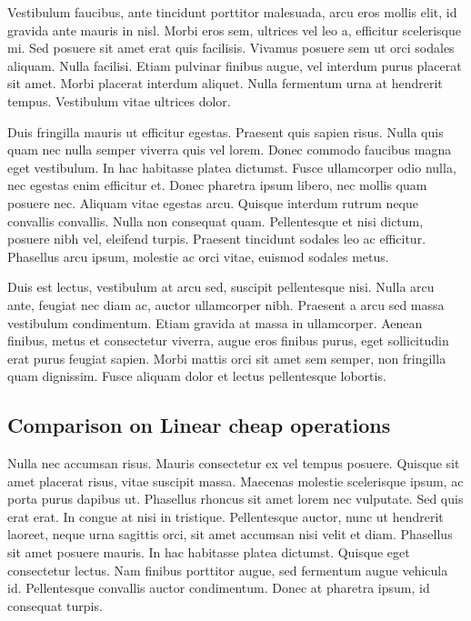 Vestibulum faucibus, ante tincidunt porttitor malesuada, arcu eros mollis elit, id gravida ante mauris in nisl. Morbi eros sem, ultrices vel leo a, efficitur scelerisque mi. Sed posuere sit amet erat quis facilisis. Vivamus posuere sem ut orci sodales aliquam. Nulla facilisi. Etiam pulvinar finibus augue, vel interdum purus placerat sit amet. Morbi placerat interdum aliquet. Nulla fermentum urna at hendrerit tempus. Vestibulum vitae ultrices dolor.

Duis fringilla mauris ut efficitur egestas. Praesent quis sapien risus. Nulla quis quam nec nulla semper viverra quis vel lorem. Donec commodo faucibus magna eget vestibulum. In hac habitasse platea dictumst. Fusce ullamcorper odio nulla, nec egestas enim efficitur et. Donec pharetra ipsum libero, nec mollis quam posuere nec. Aliquam vitae egestas arcu. Quisque interdum rutrum neque convallis convallis. Nulla non consequat quam. Pellentesque et nisi dictum, posuere nibh vel, eleifend turpis. Praesent tincidunt sodales leo ac efficitur. Phasellus arcu ipsum, molestie ac orci vitae, euismod sodales metus.

Duis est lectus, vestibulum at arcu sed, suscipit pellentesque nisi. Nulla arcu ante, feugiat nec diam ac, auctor ullamcorper nibh. Praesent a arcu sed massa vestibulum condimentum. Etiam gravida at massa in ullamcorper. Aenean finibus, metus et consectetur viverra, augue eros finibus purus, eget sollicitudin erat purus feugiat sapien. Morbi mattis orci sit amet sem semper, non fringilla quam dignissim. Fusce aliquam dolor et lectus pellentesque lobortis. 

\subsection{Comparison on Linear cheap operations} %
\label{sub:amet}
Nulla nec accumsan risus. Mauris consectetur ex vel tempus posuere. Quisque sit amet placerat risus, vitae suscipit massa. Maecenas molestie scelerisque ipsum, ac porta purus dapibus ut. Phasellus rhoncus sit amet lorem nec vulputate. Sed quis erat erat. In congue at nisi in tristique. Pellentesque auctor, nunc ut hendrerit laoreet, neque urna sagittis orci, sit amet accumsan nisi velit et diam. Phasellus sit amet posuere mauris. In hac habitasse platea dictumst. Quisque eget consectetur lectus. Nam finibus porttitor augue, sed fermentum augue vehicula id. Pellentesque convallis auctor condimentum. Donec at pharetra ipsum, id consequat turpis.






